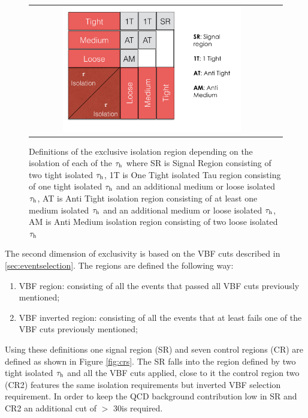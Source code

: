  	\begin{figure}[tbh!]
 		\centering
 		\begin{tabular}{cc}
 			\includegraphics[width=0.75\textwidth]{PLOTS/diTauHadLSotherPlots/tauisoregions.png}
 		\end{tabular}
 		\caption{Definitions of the exclusive isolation region depending on the isolation of each of the $\tau_{\text{h}}$ where SR is Signal Region consisting of two tight isolated $\tau_{\text{h}}$, 1T is One Tight isolated Tau region consisting of one tight isolated $\tau_{\text{h}}$ and an additional medium or loose isolated $\tau_{\text{h}}$, AT is Anti Tight isolation region consisting of at least one medium isolated $\tau_{\text{h}}$ and an additional medium or loose isolated $\tau_{\text{h}}$,  AM is Anti Medium isolation region consisting of two loose isolated $\tau_{\text{h}}$}
 		\label{fig:tauisoregions}
 	\end{figure}
 
The second dimension of exclusivity is based on the VBF cuts described in \ref{sec:eventselection}. The regions are defined the following way:
	
	\begin{enumerate}
		\item VBF region: consisting of all the events that passed all VBF cuts previously mentioned;
		\item VBF inverted region: consisting of all the events that at least fails one of the VBF cuts previously mentioned;
	\end{enumerate} 

Using these definitions one signal region (SR) and seven control regions (CR) are defined as shown in Figure \ref{fig:crs}. The SR falls into the region defined by two tight isolated $\tau_{\text{h}}$ and all the VBF cuts applied, close to it the control region two (CR2) features the same \hadtau isolation requirements but inverted VBF selection requirement. In order to keep the QCD background contribution low in SR and CR2 an additional cut of  \met $ > $ 30\gev is required.

